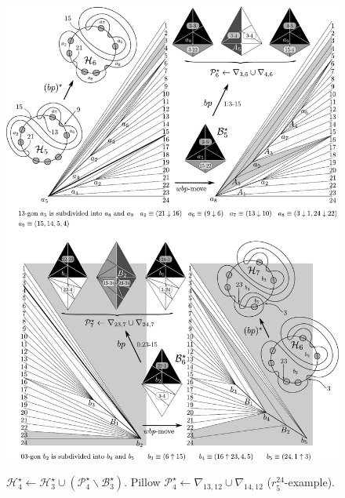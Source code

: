 \begin{figure}
\begin{center}
\includegraphics[width=15cm]{A.figs/bpandwinglist567.pdf} \\
\caption{\sf 
$\mathcal{H}^\star_{4} \leftarrow \mathcal{H}^\star_3 
\cup (\mathcal{P}_{4}^\star \backslash \mathcal{B}_3^\star)$. 
Pillow $\mathcal{P}_{4}^\star \leftarrow 
\nabla_{13,12}\cup \nabla_{14,12}$
($r^{24}_5$-example).}
\label{fig:winglist03}
\end{center}
\end{figure}

